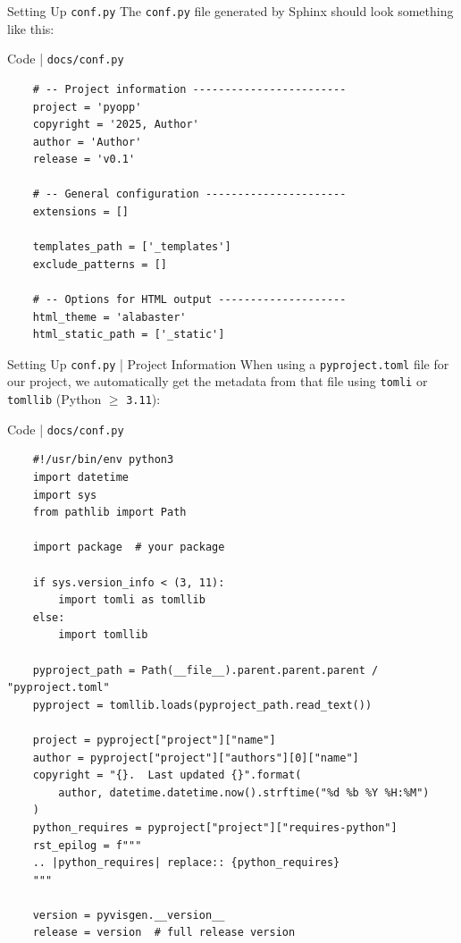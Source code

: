\begin{frame}[fragile]{Setting Up \texttt{conf.py}}
  The \texttt{conf.py} file generated by Sphinx should look something like this:
  \begin{block}{Code | \texttt{docs/conf.py}}
  \begin{verbatim}
    # -- Project information ------------------------
    project = 'pyopp'
    copyright = '2025, Author'
    author = 'Author'
    release = 'v0.1'

    # -- General configuration ----------------------
    extensions = []

    templates_path = ['_templates']
    exclude_patterns = []

    # -- Options for HTML output --------------------
    html_theme = 'alabaster'
    html_static_path = ['_static']
  \end{verbatim}
  \end{block}
\end{frame}

\begin{frame}[fragile]{Setting Up \texttt{conf.py} | Project Information}
  When using a \texttt{pyproject.toml} file for our project, we automatically get the metadata
  from that file using \texttt{tomli} or \texttt{tomllib} (Python $\geqslant$ \texttt{3.11}):
  \begin{block}{Code | \texttt{docs/conf.py}}
  \scriptsize
  \begin{verbatim}
    #!/usr/bin/env python3
    import datetime
    import sys
    from pathlib import Path

    import package  # your package

    if sys.version_info < (3, 11):
        import tomli as tomllib
    else:
        import tomllib

    pyproject_path = Path(__file__).parent.parent.parent / "pyproject.toml"
    pyproject = tomllib.loads(pyproject_path.read_text())

    project = pyproject["project"]["name"]
    author = pyproject["project"]["authors"][0]["name"]
    copyright = "{}.  Last updated {}".format(
        author, datetime.datetime.now().strftime("%d %b %Y %H:%M")
    )
    python_requires = pyproject["project"]["requires-python"]
    rst_epilog = f"""
    .. |python_requires| replace:: {python_requires}
    """

    version = pyvisgen.__version__
    release = version  # full release version
  \end{verbatim}
  \end{block}
\end{frame}



